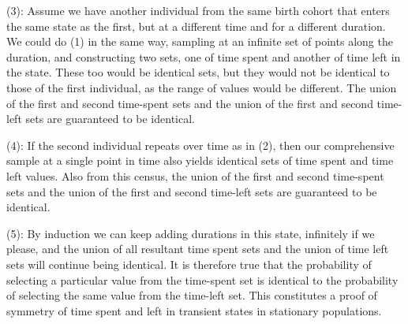 \documentclass[12pt,oneside,a4paper]{article} %
\theoremstyle{definition}
\begin{document}
(3): Assume we have another individual from the same birth cohort that enters
the same state as the first, but at a different time and for a different
duration. We could do (1) in the same way, sampling at an infinite set of points
along the duration, and constructing two sets, one of time spent and another of
time left in the state. These too would be identical sets, but they would not be
identical to those of the first individual, as the range of values would be
different. The union of the first and second time-spent sets and the union of
the first and second time-left sets are guaranteed to be identical. 

(4): If the second individual repeats over time as in (2), then our
comprehensive sample at a single point in time also yields identical sets
of time spent and time left values. Also from this census, the union of the
first and second time-spent sets and the union of the first and second time-left sets
are guaranteed to be identical. 

(5): By induction we can keep adding durations in this state, infinitely if we
please, and the union of all resultant time spent sets and the union of time
left sets will continue being identical. It is therefore true that the
probability of selecting a particular value from the time-spent set is identical
to the probability of selecting the same value from the time-left set. This
constitutes a proof of symmetry of time spent and left in transient states in
stationary populations.
\end{document}
